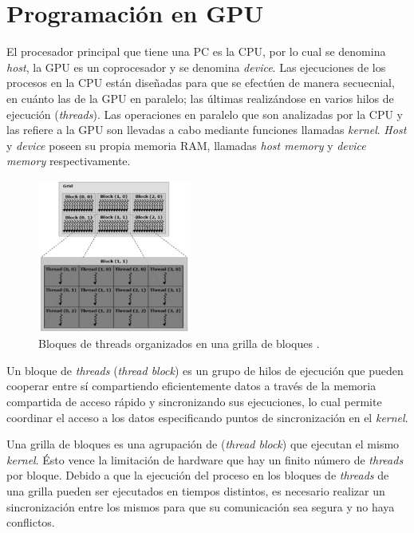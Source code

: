 \chapter{Programación en GPU}
\graphicspath{{figs/cap4/}}
\label{cap4}

El procesador principal que tiene una PC es la CPU, por lo cual se denomina \textit{host}, la GPU es un coprocesador y se denomina \textit{device}. Las ejecuciones de los procesos en la CPU están diseñadas para que se efectúen de manera secuecnial, en cuánto las de la GPU en paralelo; las últimas realizándose en varios hilos de ejecución (\textit{threads}). Las operaciones en paralelo que son analizadas por la CPU y las refiere a la GPU son llevadas a cabo mediante funciones llamadas \textit{kernel}. \textit{Host} y \textit{device} poseen su propia memoria RAM, llamadas \textit{host memory} y \textit{device memory} respectivamente. \cite{rinaldi2011modelos}

\begin{figure}[h!]
	\centering
	\includegraphics[width=0.45\textwidth]{figs/cap4/threads_block_grid.png}
	\caption{Bloques de threads organizados en una grilla de bloques \cite{rinaldi2011modelos}.}
	\label{fig:block_grid_threads}
\end{figure}

Un bloque de \textit{threads} (\textit{thread block}) es un grupo de hilos de ejecución que pueden cooperar entre sí compartiendo eficientemente datos a través de la memoria compartida de acceso rápido y sincronizando sus ejecuciones, lo cual permite coordinar el acceso a los datos especificando puntos de sincronización en el \textit{kernel}. 

Una grilla de bloques es una agrupación de (\textit{thread block}) que ejecutan el mismo \textit{kernel}. Ésto vence la limitación de hardware que hay un finito número de \textit{threads} por bloque. Debido a que la ejecución del proceso en los bloques de \textit{threads} de una grilla pueden ser ejecutados en tiempos distintos, es necesario realizar un sincronización entre los mismos para que su comunicación sea segura y no haya conflictos.\cite{tolke2010implementation}

